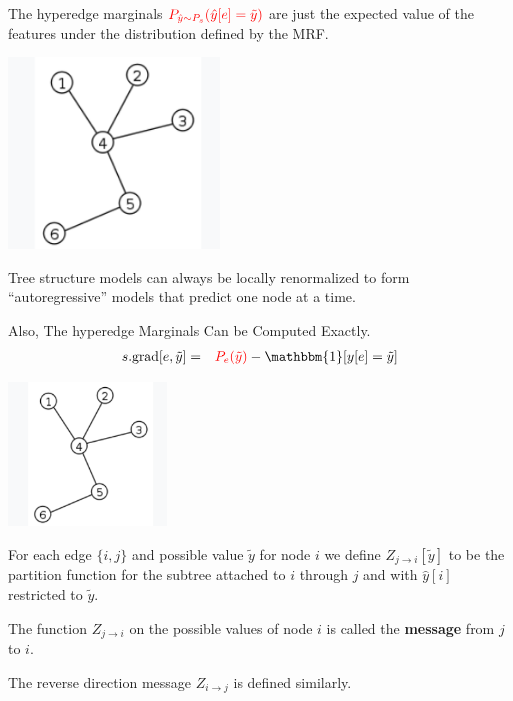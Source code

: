 {{

The hyperedge marginals  ${\color{red} P_{\hat{y} \sim P_s}(\hat{y}[e] = \tilde{y})}$ are just the expected value of the features under the distribution
defined by the MRF.
}


\centerline{\includegraphics[height= 2in]{../images/Tree}}

\vfill
Tree structure models can always be locally renormalized to form ``autoregressive'' models that
predict one node at a time.

\vfill
Also, The hyperedge Marginals Can be Computed Exactly.
\begin{eqnarray*}
  s.\mathrm{grad}[e,\tilde{y}] & = & {\color{red} P_e(\tilde{y})} - \mathbbm{1}[y[e] = \tilde{y}]
\end{eqnarray*}



\centerline{\includegraphics[height=1.5in]{../images/Tree}}

\vfill
For each edge $\{i,j\}$ and possible value $\tilde{y}$ for node $i$ we define {\color{red} $Z_{j \rightarrow i}[\tilde{y}]$}
to be  the partition function for the subtree attached to $i$ through $j$ and
with $\hat{y}[i]$ restricted to $\tilde{y}$.

\vfill
The function $Z_{j \rightarrow i}$ on the possible values of node $i$ is called the {\bf message} from $j$ to $i$.

\vfill
The reverse direction message $Z_{i \rightarrow j}$ is defined similarly.

}
